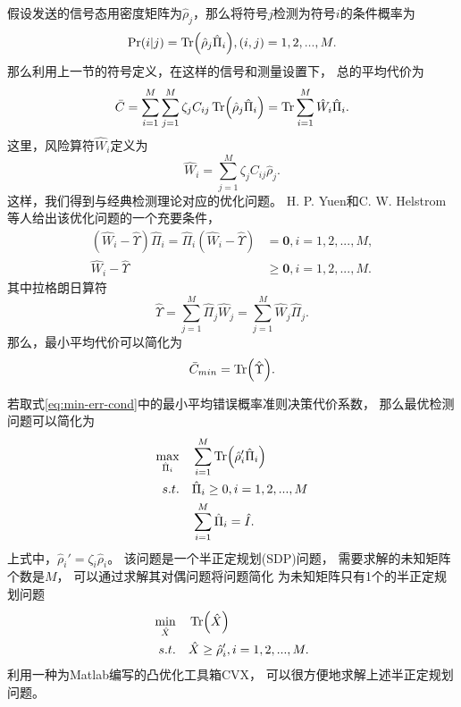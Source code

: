 假设发送的信号态用密度矩阵为$\hat{\rho}_j$，那么将符号$j$检测为符号$i$的条件概率为
\begin{equation}
\Pr(i|j) = \Tr(\hat{\rho}_j \hat{\Pi}_i), (i,j)=1,2,...,M.
\end{equation}
那么利用上一节的符号定义，在这样的信号和测量设置下，
总的平均代价为
\begin{equation}
\bar{C} =  \sum_{i=1}^M \sum_{j=1}^M \zeta_jC_{ij} \Tr(\hat{\rho}_j \hat{\Pi}_i) \\
        =  \Tr \sum_{i=1}^M \hat{W}_i \hat{\Pi}_i.
\label{eq:q-avg-C}
\end{equation}
这里，风险算符$\hat{W}_i$定义为
\begin{equation}
\hat{W}_i = \sum_{j=1}^M \zeta_jC_{ij}\hat{\rho}_j.
\end{equation}
这样，我们得到与经典检测理论对应的优化问题。
H. P. Yuen和C. W. Helstrom等人给出该优化问题的一个充要条件，
\begin{equation}
\begin{split}
(\hat{W}_i - \hat{\Upsilon})\hat{\Pi}_i = \hat{\Pi}_i(\hat{W}_i - \hat{\Upsilon}) & = \bm{0}, i=1,2,...,M,  \\
\hat{W}_i - \hat{\Upsilon} & \ge \bm{0}, i=1,2,...,M.
\label{eq:optim-povm-cond}
\end{split}
\end{equation}
其中拉格朗日算符
\begin{equation}
\hat{\Upsilon} = \sum_{j=1}^M \hat{\Pi}_j\hat{W}_j = \sum_{j=1}^M\hat{W}_j\hat{\Pi}_j.
\end{equation}
那么，最小平均代价可以简化为
\begin{equation}
\bar{C}_{min} = \Tr(\hat{\Upsilon}).
\end{equation}

若取式\ref{eq:min-err-cond}中的最小平均错误概率准则决策代价系数，
那么最优检测问题可以简化为
\begin{equation}
\begin{split}
\max_{\hat{\Pi}_i}  \quad  &  \sum_{i=1}^M \Tr(\hat{\rho}_i'\hat{\Pi}_i) \\
s.t. \quad  & \hat{\Pi}_i \ge 0, i=1,2,...,M   \\
     \quad  & \sum_{i=1}^M \hat{\Pi}_i = \hat{I}.
\end{split}
\end{equation}
上式中，$\hat{\rho}_i' = \zeta_i \hat{\rho}_i$。
该问题是一个半正定规划(SDP)问题，
需要求解的未知矩阵个数是$M$，
可以通过求解其对偶问题将问题简化
为未知矩阵只有1个的半正定规划问题\cite{eldar2003designing}
\begin{equation}
\begin{split}
\min_{\hat{X}}  \quad & \Tr(\hat{X}) \\
s.t.          \quad & \hat{X} \ge \hat{\rho}_i', i=1,2,...,M.
\label{eq:Hel-SDP}
\end{split}
\end{equation}
利用一种为Matlab编写的凸优化工具箱CVX，
可以很方便地求解上述半正定规划问题\cite{cvx,gb08}。

